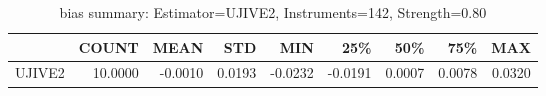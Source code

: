 \begin{table}[ht]
\centering
\caption{bias summary: Estimator=UJIVE2, Instruments=142, Strength=0.80}
\begin{tabular}{lrrrrrrrr}
\toprule
 & COUNT & MEAN & STD & MIN & 25\% & 50\% & 75\% & MAX \\
\midrule
UJIVE2 & 10.0000 & -0.0010 & 0.0193 & -0.0232 & -0.0191 & 0.0007 & 0.0078 & 0.0320 \\
\bottomrule
\end{tabular}
\end{table}
